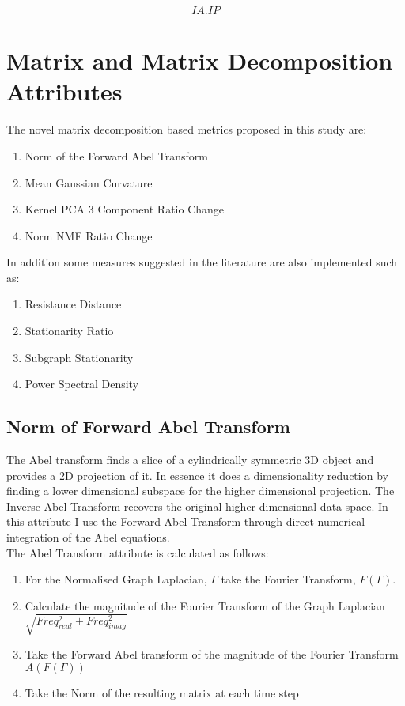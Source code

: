 \begin{equation}
      IA . IP
\end{equation}



\section{Matrix and Matrix Decomposition Attributes}

The novel matrix decomposition based metrics proposed in this study are:

\begin{enumerate}
    \item Norm of the Forward Abel Transform
    \item Mean Gaussian Curvature
    \item Kernel PCA 3 Component Ratio Change
    \item Norm NMF Ratio Change
    
\end{enumerate}

In addition some measures suggested in the literature are also implemented such as:

\begin{enumerate}
    \item Resistance Distance \cite{Klein1993}
    \item Stationarity Ratio \cite{Perraudin2016}
    \item Subgraph Stationarity \cite{Gupta}
    \item Power Spectral Density \cite{Perraudin2016}
\end{enumerate}

\subsection{Norm of Forward Abel Transform}

The Abel transform finds a slice of a cylindrically symmetric 3D object and provides a 2D projection of it. In essence it does a dimensionality reduction by finding a lower dimensional subspace for the higher dimensional projection. The Inverse Abel Transform recovers the original higher dimensional data space. In this attribute I use the Forward Abel Transform through direct numerical integration of the Abel equations. \\

The Abel Transform attribute is calculated as follows:

\begin{enumerate}
  \item For the Normalised Graph Laplacian, $\Gamma$ take the Fourier Transform, $F(\Gamma)$.
  \item Calculate the magnitude of the Fourier Transform of the Graph Laplacian $\sqrt{Freq_{real}^2 +Freq_{imag}^2}$
  \item Take the Forward Abel transform of the magnitude of the Fourier Transform $A(F(\Gamma))$
  \item Take the Norm of the resulting matrix at each time step
\end{enumerate}


